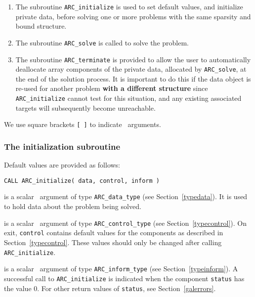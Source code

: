 \documentclass{galahad}
\newcommand{\packagename}{ARC}
\begin{document}
\begin{enumerate}
\item The subroutine
      {\tt \packagename\_initialize}
      is used to set default values, and initialize private data,
      before solving one or more problems with the
      same sparsity and bound structure.
\item The subroutine
      {\tt \packagename\_solve}
      is called to solve the problem.
\item The subroutine
      {\tt \packagename\_terminate}
      is provided to allow the user to automatically deallocate array
       components of the private data, allocated by
       {\tt \packagename\_solve},
       at the end of the solution process.
       It is important to do this if the data object is re-used for another
       problem {\bf with a different structure}
       since {\tt \packagename\_initialize} cannot test for this situation,
       and any existing associated targets will subsequently become unreachable.
\end{enumerate}
We use square brackets {\tt [ ]} to indicate \optional\ arguments.


\subsubsection{The initialization subroutine}\label{subinit}
 Default values are provided as follows:
\vspace*{1mm}

\hspace{8mm}
{\tt CALL \packagename\_initialize( data, control, inform )}

\vspace*{-3mm}
\begin{description}

 is a scalar \intentinout\ argument of type
{\tt \packagename\_data\_type}
(see Section~\ref{typedata}). It is used to hold data about the problem being
solved.

 is a scalar \intentout\ argument of type
{\tt \packagename\_control\_type}
(see Section~\ref{typecontrol}).
On exit, {\tt control} contains default values for the components as
described in Section~\ref{typecontrol}.
These values should only be changed after calling
{\tt \packagename\_initialize}.

 is a scalar \intentout\ argument of type
{\tt \packagename\_inform\_type}
(see Section~\ref{typeinform}). A successful call to
{\tt \packagename\_initialize}
is indicated when the  component {\tt status} has the value 0.
For other return values of {\tt status}, see Section~\ref{galerrors}.

\end{description}
\end{document}
